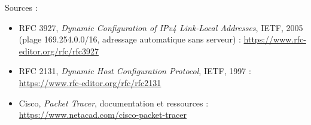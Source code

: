 \documentclass[
  french,
  10pt,
  a4paper,
]{scrartcl}
\providecommand{\tightlist}{%
  \setlength{\itemsep}{0pt}\setlength{\parskip}{0pt}}
\begin{document}
Sources :

\begin{itemize}
\tightlist
\item
  RFC 3927, \emph{Dynamic Configuration of IPv4 Link-Local Addresses},
  IETF, 2005 (plage 169.254.0.0/16, adressage automatique sans serveur)
  : \url{https://www.rfc-editor.org/rfc/rfc3927}
\item
  RFC 2131, \emph{Dynamic Host Configuration Protocol}, IETF, 1997 :
  \url{https://www.rfc-editor.org/rfc/rfc2131}
\item
  Cisco, \emph{Packet Tracer}, documentation et ressources :
  \url{https://www.netacad.com/cisco-packet-tracer}
\end{itemize}
\end{document}
